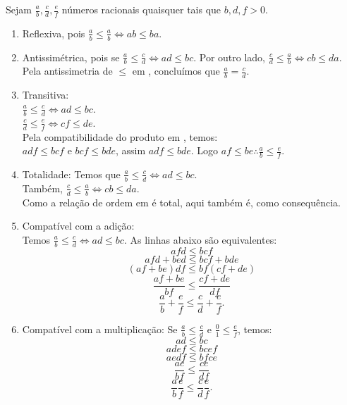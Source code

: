 \documentclass[../main.tex]{subfiles}
\begin{document}
\begin{dem}
    Sejam $\frac{a}{b}, \frac{c}{d}, \frac{e}{f}$ números racionais quaisquer tais que $b,d,f > 0$.
    \begin{enumerate}[label=(\roman*)]
        \item Reflexiva, pois $\frac{a}{b} \leq \frac{a}{b} \iff ab \leq ba$.
        \item Antissimétrica, pois se $\frac{a}{b} \leq \frac{c}{d} \iff ad \leq bc$. Por outro lado, $\frac{c}{d} \leq \frac{a}{b} \iff cb \leq da$. Pela antissimetria de $\leq$ em \Z, concluímos que $\frac{a}{b} = \frac{c}{d}$.
        \item Transitiva: \\
        $\frac{a}{b} \leq \frac{c}{d} \iff ad \leq bc$. \\
        $\frac{c}{d} \leq \frac{e}{f} \iff cf \leq de$. \\
        Pela compatibilidade do produto em \Z, temos: \\
        $adf \leq bcf$ e $bcf \leq bde$, assim $adf \leq bde$.
        Logo $af \leq be \therefore \frac{a}{b} \leq \frac{e}{f}$.
        
        \item Totalidade:
        Temos que $\frac{a}{b} \leq \frac{c}{d} \iff ad \leq bc$. \\
        Também, $\frac{c}{d} \leq \frac{a}{b} \iff cb \leq da$. \\
        Como a relação de ordem em \Z é total, aqui também é, como consequência.
        
        \item Compatível com a adição: \\
        Temos $\frac{a}{b} \leq \frac{c}{d} \iff ad \leq bc$. As linhas abaixo são equivalentes: \\
        \[ afd \leq bcf \]
        \[ afd + bed \leq bcf + bde \]   
        \[ (af+be)df \leq bf(cf+de) \]
        \[ \frac{af+be}{bf} \leq \frac{cf+de}{df} \]
        \[ \frac{a}{b} + \frac{e}{f} \leq \frac{c}{d} + \frac{e}{f}. \]
        
        \item Compatível com a multiplicação:
        Se $\frac{a}{b} \leq \frac{c}{d}$ e $\frac{0}{1} \leq \frac{e}{f}$, temos: \\
        
            \[ ad \leq bc \]
            \[adef \leq bcef \] 
            \[ aedf \leq bfce \]
            \[\frac{ae}{bf} \leq \frac{ce}{df} \] 
            \[\frac{a}{b} \frac{e}{f} \leq \frac{c}{d} \frac{e}{f}. \]                   
    \end{enumerate}
\end{dem}
\end{document}
